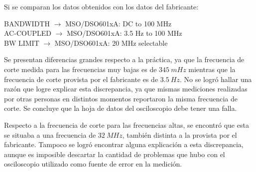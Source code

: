 \documentclass[11pt, a4paper]{article}
\begin{document}
Si se comparan los datos obtenidos con los datos del fabricante:
\begin{center}
BANDWIDTH $\rightarrow$ MSO/DSO601xA: DC to 100 MHz\\
AC-COUPLED $\rightarrow$ MSO/DSO601xA: 3.5 Hz to 100 MHz\\
BW LIMIT $\rightarrow$ MSO/DSO601xA: 20 MHz selectable\\
\end{center}

Se presentan diferencias grandes respecto a la práctica, ya que la frecuencia de corte medida para las frecuencias muy bajas es de $345 \ mHz$ mientras que la frecuencia de corte provista por el fabricante es de $3.5 \ Hz$. No se logró hallar una razón que logre explicar esta discrepancia, ya que mismas mediciones realizadas por otras personas en distintos momentos reportaron la misma frecuencia de corte. Se concluye que la hoja de datos del osciloscopio debe tener una falla.

Respecto a la frecuencia de corte para las frecuencias altas, se encontró que esta se situaba a una frecuencia de $32 \ MHz$, también distinta a la provista por el fabricante. Tampoco se logró encontrar alguna explicación a esta discrepancia, aunque es imposible descartar la cantidad de problemas que hubo con el osciloscopio utilizado como fuente de error en la medición.
\end{document}
